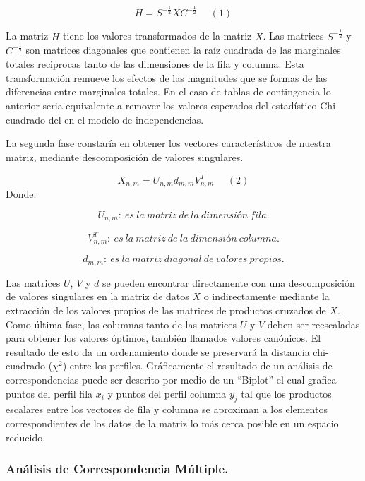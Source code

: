 \[ H=S^{-\frac{1}{2}}XC^{-\frac{1}{2}} \ \ \ \ \ \ (1)\]

La matriz \(H\) tiene los valores transformados de la matriz \(X\). Las
matrices \(S^{-\frac{1}{2}}\) y \(C^{-\frac{1}{2}}\) son matrices
diagonales que contienen la raíz cuadrada de las marginales totales
reciprocas tanto de las dimensiones de la fila y columna. Esta
transformación remueve los efectos de las magnitudes que se formas de
las diferencias entre marginales totales. En el caso de tablas de
contingencia lo anterior seria equivalente a remover los valores
esperados del estadístico Chi-cuadrado del en el modelo de
independencias.

La segunda fase constaría en obtener los vectores característicos de
nuestra matriz, mediante descomposición de valores singulares.

\[ X_{n,m}= U_{n,m}d_{m,m}V^{T}_{n,m} \ \ \ \ \ \ (2) \] Donde:

\[ U_{n,m} : \ es \ la \ matriz \ de \ la \ dimensión \ fila. \]

\[ V^{T}_{n,m} : \ es \ la \  matriz \ de \ la \ dimensión \ columna. \]

\[ d_{m,m} : \ es \ la \ matriz \ diagonal \ de \ valores \ propios.\]

Las matrices \(U\), \(V\) y \(d\) se pueden encontrar directamente con
una descomposición de valores singulares en la matriz de datos \(X\) o
indirectamente mediante la extracción de los valores propios de las
matrices de productos cruzados de \(X\). Como última fase, las columnas
tanto de las matrices \(U\) y \(V\) deben ser reescaladas para obtener
los valores óptimos, también llamados valores canónicos. El resultado de
esto da un ordenamiento donde se preservará la distancia chi-cuadrado
(\(\chi ^{2}\)) entre los perfiles. Gráficamente el resultado de un
análisis de correspondencias puede ser descrito por medio de un
``Biplot'' el cual grafica puntos del perfil fila \(x_i\) y puntos del
perfil columna \(y_j\) tal que los productos escalares entre los
vectores de fila y columna se aproximan a los elementos correspondientes
de los datos de la matriz lo más cerca posible en un espacio reducido.

\hypertarget{anuxe1lisis-de-correspondencia-muxfaltiple.}{%
\subsubsection{Análisis de Correspondencia
Múltiple.}\label{anuxe1lisis-de-correspondencia-muxfaltiple.}}

